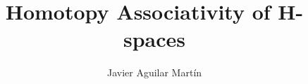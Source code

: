 \documentclass{beamer}
\title{Homotopy Associativity of H-spaces}
\author{Javier Aguilar Mart\'in}
\institute{University of Kent}
\date{}
\theoremstyle{definition}
\begin{document}
\frame{\titlepage}
%
% 
% 
% 

% 



\newcommand{\seti}{\setcounter{saveenumi}{\value{enumi}}}
\newcommand{\conti}{\setcounter{enumi}{\value{saveenumi}}}

\makeatletter
\newcommand{\xRightarrow}[2][]{\ext@arrow 0359\Rightarrowfill@{#1}{#2}}
\makeatother


%	
%




\end{document}
